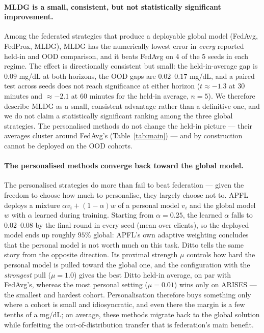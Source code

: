 \documentclass[10pt,letterpaper]{article}
\begin{document}
\paragraph{MLDG is a small, consistent, but not statistically significant
improvement.} Among the federated strategies that produce a deployable global
model (FedAvg, FedProx, MLDG), MLDG
has the numerically lowest error in \emph{every} reported held-in and OOD
comparison, and
it beats FedAvg on 4 of the 5 seeds in each regime. The effect is directionally
consistent but small: the held-in-average gap is $0.09$ mg/dL at both horizons,
the OOD gaps are $0.02$--$0.17$ mg/dL, and a paired test across seeds does not
reach significance at either horizon ($t \approx -1.3$ at 30 minutes and
$\approx -2.1$ at 60 minutes for the held-in average, $n=5$). We therefore
describe MLDG as a small, consistent advantage rather than a definitive one, and
we do not claim a statistically significant ranking among the three global
strategies. The personalised methods do not change the
held-in picture --- their averages cluster around FedAvg's
(Table~\ref{tab:main}) --- and by construction cannot be deployed on the OOD
cohorts.

\paragraph{The personalised methods converge back toward the global model.} The
personalised strategies do more than fail to beat federation --- given the freedom
to choose how much to personalise, they largely choose not to. APFL deploys a
mixture $\alpha v_i + (1-\alpha) w$ of a personal model $v_i$ and the global model
$w$ with $\alpha$ learned during training. Starting from $\alpha = 0.25$, the
learned $\alpha$ falls to $0.02$--$0.08$ by the final round in every seed
(mean over clients), so the deployed model ends up roughly $95\%$ global: APFL's
own adaptive weighting concludes that the personal model is not worth much on this
task. Ditto tells the same story from the opposite direction. Its proximal
strength $\mu$ controls how hard the personal model is pulled toward the global
one, and the configuration with the \emph{strongest} pull ($\mu = 1.0$) gives
the best Ditto held-in average, on par with FedAvg's, whereas the most personal
setting ($\mu = 0.01$) wins only on ARISES --- the smallest and hardest
cohort. Personalisation therefore buys something only where a cohort is small and
idiosyncratic, and even there the margin is a few tenths of a mg/dL; on average,
these methods migrate back to the global solution while forfeiting the
out-of-distribution transfer that is federation's main benefit.
\end{document}
